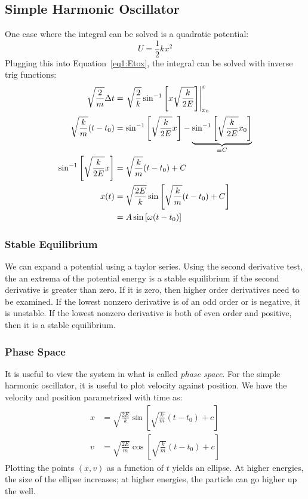 \subsection{Simple Harmonic Oscillator}
One case where the integral can be solved is a quadratic potential:
\[U=\frac{1}{2}kx^2\]
Plugging this into Equation~\ref{eq1:Etox}, the integral can be solved with inverse trig functions:
\begin{subequations}
\begin{align}
	\sqrt{\frac{2}{m}}\Delta t&= \left.\sqrt{\frac{2}{k}}\sin^{-1}\left[x\sqrt{\frac{k}{2E}} \right]\right|_{x_0}^{x}\nonumber\\
	\sqrt{\frac{k}{m}}(t-t_0) &= \sin^{-1}\left[\sqrt{\frac{k}{2E}}x\right]-\underbrace{\sin^{-1}\left[\sqrt{\frac{k}{2E}}x_0\right]}_{\equiv C}\nonumber\\
\sin^{-1}\left[\sqrt{\frac{k}{2E}}x\right]&=\sqrt{\frac{k}{m}}(t-t_0)+C\nonumber\\
x(t)&=\sqrt{\frac{2E}{k}}\sin\left[\sqrt{\frac{k}{m}}(t-t_0)+C\right]\\
    &= A\sin\left[\omega(t-t_0)\right]\label{eq1:shm}
\end{align}
\end{subequations}
\subsubsection{Stable Equilibrium}
We can expand a potential using a taylor series. Using the second derivative test, the an extrema of the potential energy is a stable equilibrium if the second derivative is greater than zero. If it is zero, then higher order derivatives need to be examined. If the lowest nonzero derivative is of an odd order or is negative, it is unstable. If the lowest nonzero derivative is both of even order and positive, then it is a stable equilibrium. 

\subsubsection{Phase Space}
It is useful to view the system in what is called \emph{phase space}. For the simple harmonic oscillator, it is useful to plot velocity against position. We have the velocity and position parametrized with time as:
\begin{align*}
	x&=\sqrt{\frac{2E}{k}}\sin\left[\sqrt{\frac{k}{m}}(t-t_0)+c\right]\\
	v&=\sqrt{\frac{2E}{m}}\cos\left[\sqrt{\frac{k}{m}}(t-t_0)+c\right]
\end{align*}
Plotting the points \((x,v)\) as a function of \(t\) yields an ellipse. At higher energies, the size of the ellipse increases; at higher energies, the particle can go higher up the well.

